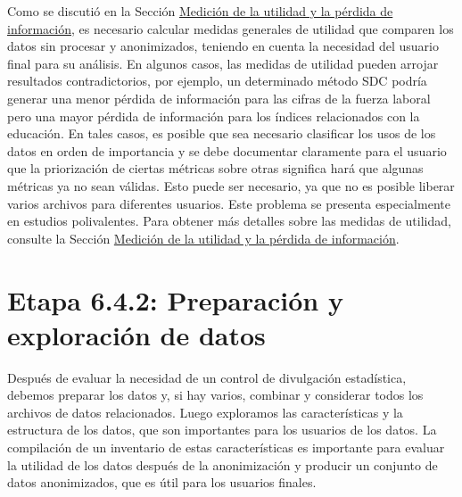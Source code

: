 \documentclass[
]{book}
\theoremstyle{definition}
\theoremstyle{definition}
\theoremstyle{definition}
\theoremstyle{definition}
\theoremstyle{remark}
\begin{document}
Como se discutió en la Sección \protect\hyperlink{mediciuxf3n-de-la-utilidad-y-la-puxe9rdida-de-informaciuxf3n}{Medición de la utilidad y la pérdida de información}, es necesario calcular medidas generales de utilidad que comparen los datos sin procesar y anonimizados, teniendo en cuenta la necesidad del usuario final para su análisis. En algunos casos, las medidas de utilidad pueden arrojar resultados contradictorios, por ejemplo, un determinado método SDC podría generar una menor pérdida de información para las cifras de la fuerza laboral pero una mayor pérdida de información para los índices relacionados con la educación. En tales casos, es posible que sea necesario clasificar los usos de los datos en orden de importancia y se debe documentar claramente para el usuario que la priorización de ciertas métricas sobre otras significa hará que algunas métricas ya no sean válidas. Esto puede ser necesario, ya que no es posible liberar varios archivos para diferentes usuarios. Este problema se presenta especialmente en estudios polivalentes. Para obtener más detalles sobre las medidas de utilidad, consulte la Sección \protect\hyperlink{mediciuxf3n-de-la-utilidad-y-la-puxe9rdida-de-informaciuxf3n}{Medición de la utilidad y la pérdida de información}.

\hypertarget{etapa-6.4.2-preparaciuxf3n-y-exploraciuxf3n-de-datos}{%
\section{Etapa 6.4.2: Preparación y exploración de datos}\label{etapa-6.4.2-preparaciuxf3n-y-exploraciuxf3n-de-datos}}

Después de evaluar la necesidad de un control de divulgación estadística, debemos preparar los datos y, si hay varios, combinar y considerar todos los archivos de datos relacionados. Luego exploramos las características y la estructura de los datos, que son importantes para los usuarios de los datos. La compilación de un inventario de estas características es importante para evaluar la utilidad de los datos después de la anonimización y producir un conjunto de datos anonimizados, que es útil para los usuarios finales.
\end{document}
